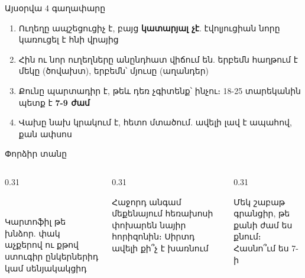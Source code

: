 \notopic

\begin{frame}{Այսօրվա 4 գաղափարը}
  \begin{enumerate}
    \item<1-> Ուղեղը ապշեցուցիչ է, բայց \textbf{կատարյալ չէ}. էվոլյուցիան նորը կառուցել է հնի վրայից
    \item<2-> Հին ու նոր ուղեղները անընդհատ վիճում են. երբեմն հաղթում է մեկը (ծովախտ), երբեմն՝ մյուսը (աղանդեր)
    \item<3-> Քունը պարտադիր է, թեև դեռ չգիտենք՝ ինչու։ 18-25 տարեկանին պետք է \textbf{7-9 ժամ}
    \item<4-> Վախը նախ կրակում է, հետո մտածում. ավելի լավ է ապահով, քան ափսոս
  \end{enumerate}
\end{frame}

\begin{frame}{Փորձիր տանը}
  \begin{columns}[T]
    \begin{column}{0.31\textwidth}
      \begin{card}[colback=mint!30!cardwhite]
        \centering{}\ \par\smallskip
        \raggedright Կարտոֆիլ թե խնձոր. փակ աչքերով ու քթով ստուգիր ընկերներիդ կամ սենյակակցիդ
      \end{card}
    \end{column}
    \begin{column}{0.31\textwidth}
      \begin{card}[colback=lavender!35!cardwhite]
        \centering{}\par\smallskip
        \raggedright Հաջորդ անգամ մեքենայում հեռախոսի փոխարեն նայիր հորիզոնին։ Սիրտդ ավելի քի՞չ է խառնում
      \end{card}
    \end{column}
    \begin{column}{0.31\textwidth}
      \begin{card}[colback=peach!35!cardwhite]
        \centering{}\par\smallskip
        \raggedright Մեկ շաբաթ գրանցիր, թե քանի ժամ ես քնում։ Հասնո՞ւմ ես 7-ի
      \end{card}
    \end{column}
  \end{columns}
\end{frame}


